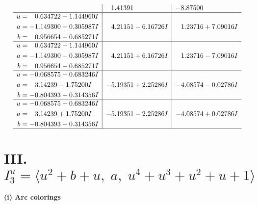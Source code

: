 \documentclass[1p]{elsarticle_modified}
\theoremstyle{definition}
\begin{document}
$$\begin{array}{c|c|c}
 & \phantom{-}1.41391\phantom{ +0.000000I} & -8.87500\phantom{ +0.000000I} \\ \hline\begin{aligned}
u &= \phantom{-}0.634722 + 1.144960 I \\
a &= -1.149300 + 0.305987 I \\
b &= \phantom{-}0.956654 + 0.685271 I\end{aligned}
 & \phantom{-}4.21151 - 6.16726 I & \phantom{-}1.23716 + 7.09016 I \\ \hline\begin{aligned}
u &= \phantom{-}0.634722 - 1.144960 I \\
a &= -1.149300 - 0.305987 I \\
b &= \phantom{-}0.956654 - 0.685271 I\end{aligned}
 & \phantom{-}4.21151 + 6.16726 I & \phantom{-}1.23716 - 7.09016 I \\ \hline\begin{aligned}
u &= -0.068575 + 0.683246 I \\
a &= \phantom{-}3.14239 - 1.75200 I \\
b &= -0.804393 - 0.314356 I\end{aligned}
 & -5.19351 + 2.25286 I & -4.08574 - 0.02786 I \\ \hline\begin{aligned}
u &= -0.068575 - 0.683246 I \\
a &= \phantom{-}3.14239 + 1.75200 I \\
b &= -0.804393 + 0.314356 I\end{aligned}
 & -5.19351 - 2.25286 I & -4.08574 + 0.02786 I\\
 \hline 
 \end{array}$$\newpage\newpage\renewcommand{\arraystretch}{1}
\centering \section*{III. $I^u_{3}= \langle u^2+b+u,\;a,\;u^4+u^3+u^2+u+1 \rangle$}
\flushleft \textbf{(i) Arc colorings}\\
\end{document}
